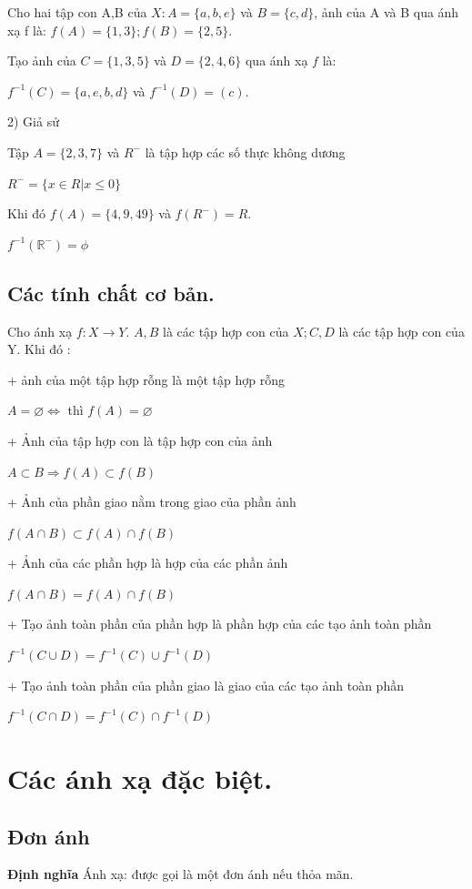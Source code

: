 \documentclass[12pt,oneside,a4paper,reqno]{book}
\begin{document}
Cho hai tập con A,B của $X: A=\{a,b,e\}$  và $B=\{c,d\}$, ảnh của A và B qua ánh xạ f là: $f(A)=\{1,3\} ; f(B)=\{2,5\}.$

Tạo ảnh của $C=\{1,3,5\}$  và $D=\{2,4,6\}$ qua ánh xạ $f$ là:

$ f^{-1} (C)=\{a,e,b,d\}$  và $f^{-1} (D)=(c).$

2) Giả sử 

Tập $A=\{2,3,7\}$ và $R^-$  là tập hợp các số thực không dương

 $R^-=\{x\in R | x\le 0\}$
 
 Khi đó $f(A)=\{4,9,49\}$  và $f(R^- )=R.$
 
$f^{-1} (\mathbb{R}^- )=\phi$

\subsection{Các tính chất cơ bản.}
         Cho ánh xạ $f:X\to Y$.  $A,B$ là các tập hợp con của $X; C,D$ là các tập hợp con của Y. Khi đó :
         
+ ảnh của một tập hợp rỗng là một tập hợp rỗng

   $A=\varnothing \Leftrightarrow $ thì $f(A)=\varnothing$
   
+ Ảnh của tập hợp con là tập hợp con của ảnh

   $A\subset B \Rightarrow f(A)\subset f(B)$
   
+ Ảnh của phần giao nằm trong giao của phần ảnh

   $f(A \cap B)\subset f(A)\cap f(B)$
   
+ Ảnh của các phần hợp là hợp của các phần ảnh

$f(A\cap B)=f(A)\cap f(B) $

+ Tạo ảnh toàn phần của phần hợp là phần hợp của các tạo ảnh toàn phần

 $ f^{-1} (C \cup D)=f^{-1} (C)\cup f^{-1} (D)$
 
+ Tạo ảnh toàn phần của phần giao là giao của các tạo ảnh toàn phần

$f^{-1} (C \cap D)=f^{-1}(C) \cap f^{-1} (D)$

\section{Các ánh xạ đặc biệt.}
\subsection{Đơn ánh}
\textbf{Định nghĩa }
Ánh xạ:  được gọi là một đơn ánh nếu thỏa mãn. 
\end{document}
